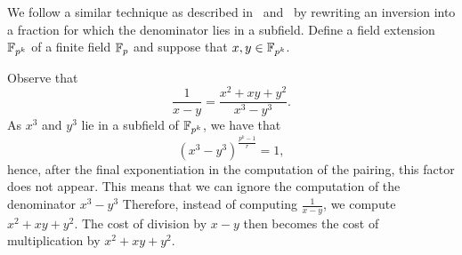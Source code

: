 %
%


We follow a similar technique as described in~\cite{2008/lin} and~\cite{2009/deg15}
by rewriting an inversion into a fraction for which the denominator lies in a subfield.
Define a field extension $\mathbb{F}_{p^k}$ of a finite field $\mathbb{F}_{p}$ and suppose that $x,y \in \mathbb{F}_{p^k}$.

Observe that
$$ \frac{1}{x-y} = \frac{x^2 + xy + y^2}{x^3 - y^3}. $$
As $x^3$ and $y^3$ lie in a subfield of $\mathbb{F}_{p^k}$, we have that
\[(x^{3} - y^{3})^{\frac{p^{k}-1}{r}} = 1,\]
hence, after the final exponentiation in the computation of the pairing, this factor does not appear.
This means that we can ignore the computation of the denominator $x^3 - y^3$
Therefore, instead of computing $\frac{1}{x-y}$, we compute $x^2 + xy + y^2$.
The cost of division by $x - y$ then becomes the cost of multiplication by $x^2 + xy + y^2$.


